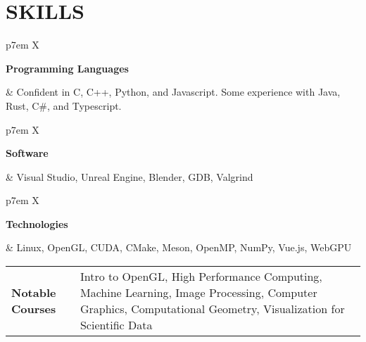 \documentclass[paper=a4,fontsize=11pt]{scrartcl} %
\newlength{\spacebox}
\newcommand{\sepspace}{\vspace*{1em}}		%
\newcommand{\sym}{\raisebox{1pt}{$\blacktriangleright$}}
\newcommand{\NewPart}[1]{\section*{\sym \mbox{} \MakeUppercase{#1}}}
\newcommand{\PersonalEntry}[2]{
		\noindent\hangindent=2em\hangafter=0 %
		\parbox{\spacebox}{        %
		\textit{#1}}		       %
		\hspace{1.5em} #2 \par
		\sepspace}
\newcommand{\SkillsEntry}[2]{      %
		\noindent
		\begin{tabularx}{\linewidth}{ p{7em} X }
			\noindent
			\begin{minipage}[t]{7em}
				\textbf{#1}
			\end{minipage} &
			\noindent \normalfont \small #2
		\end{tabularx}
		\sepspace}
\begin{document}
\NewPart{Skills}{}

\SkillsEntry{Programming Languages}{
	Confident in C, C++, Python, and Javascript.
	Some experience with Java, Rust, C\#, and Typescript.
}

\SkillsEntry{Software}{
	Visual Studio, Unreal Engine, Blender, GDB, Valgrind
}

\SkillsEntry{Technologies}{
	Linux, OpenGL, CUDA, CMake, Meson, OpenMP, NumPy, Vue.js, WebGPU
}

\SkillsEntry{Notable Courses}{
	Intro to OpenGL, High Performance Computing, 
	Machine Learning, Image Processing, Computer Graphics,
	Computational Geometry, Visualization for Scientific Data
}
\end{document}
